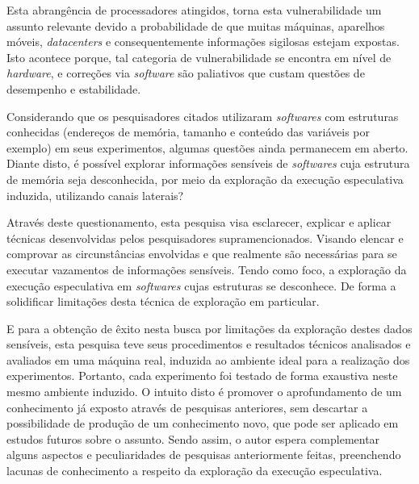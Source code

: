 \documentclass[
	article,			    %
	12pt,				    %
	oneside,			    %
	a4paper,			    %
	chapter=TITLE,		    %
	section=TITLE,		    %
	subsection=TITLE,	    %
	english,			    %
	brazil,				    %
	sumario=tradicional
]{abntex2}
\begin{document}
Esta abrangência de processadores atingidos, torna esta vulnerabilidade um assunto relevante devido a probabilidade de que muitas máquinas, aparelhos móveis, \emph{datacenters} e consequentemente informações sigilosas estejam expostas. Isto acontece porque, tal categoria de vulnerabilidade se encontra em nível de \emph{hardware}, e correções via \emph{software} são paliativos que custam questões de desempenho e estabilidade.

Considerando que os pesquisadores citados utilizaram \emph{softwares} com estruturas conhecidas (endereços de memória, tamanho e conteúdo das variáveis por exemplo) em seus experimentos, algumas questões ainda permanecem em aberto. Diante disto, é possível explorar informações sensíveis de \emph{softwares} cuja estrutura de memória seja desconhecida, por meio da exploração da execução especulativa induzida, utilizando canais laterais?

Através deste questionamento, esta pesquisa visa esclarecer, explicar e aplicar técnicas desenvolvidas pelos pesquisadores supramencionados. Visando elencar e comprovar as circunstâncias envolvidas e que realmente são necessárias para se executar vazamentos de informações sensíveis. Tendo como foco, a exploração da execução especulativa em \emph{softwares} cujas estruturas se desconhece. De forma a solidificar limitações desta técnica de exploração em particular.

E para a obtenção de êxito nesta busca por limitações da exploração destes dados sensíveis, esta pesquisa teve seus procedimentos e resultados técnicos analisados e avaliados em uma máquina real, induzida ao ambiente ideal para a realização dos experimentos. Portanto, cada experimento foi testado de forma exaustiva neste mesmo ambiente induzido. O intuito disto é promover o aprofundamento de um conhecimento já exposto através de pesquisas anteriores, sem descartar a possibilidade de produção de um conhecimento novo, que pode ser aplicado em estudos futuros sobre o assunto. Sendo assim, o autor espera complementar alguns aspectos e peculiaridades de pesquisas anteriormente feitas, preenchendo lacunas de conhecimento a respeito da exploração da execução especulativa.
\end{document}
